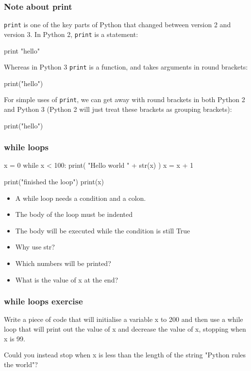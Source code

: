 \documentclass{beamer}
\begin{document}
\begin{frame}[fragile]
\frametitle{Note about print}
\texttt{print} is one of the key parts of Python that changed between
version 2 and version 3. In Python 2, \texttt{print} is a statement:

\begin{code}
print "hello"
\end{code}

Whereas in Python 3 \texttt{print} is a function, and takes arguments in round brackets:

\begin{code}
print("hello")
\end{code}

For simple uses of \texttt{print}, we can get away with round brackets
in both Python 2 and Python 3 (Python 2 will just treat these brackets
as grouping brackets):

\begin{code}
print("hello")
\end{code}

\end{frame}


\begin{frame}[fragile]
\frametitle{while loops}
\begin{code}
x = 0
while x < 100:
   print( "Hello world " + str(x) )
   x = x + 1

print("finished the loop")
print(x)
\end{code}
\begin{itemize}
\item A while loop needs a condition and a colon.
\item The body of the loop must be indented
\item The body will be executed while the condition is still True
\item Why use str?
\item Which numbers will be printed?
\item What is the value of x at the end?
\end{itemize}
\end{frame}

\begin{frame}[fragile]
\frametitle{while loops exercise}
Write a piece of code that will initialise a variable x to 200
and then use a while loop that will print out the value of x
and decrease the value of x, stopping when x is 99.

\bigskip

Could you instead stop when x is less than the length of
the string "Python rules the world"?
\end{frame}
\end{document}
